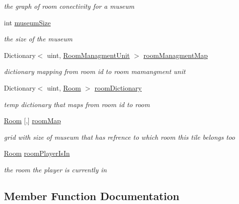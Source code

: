 \begin{DoxyCompactItemize}
\begin{DoxyCompactList}\small\item\em the graph of room conectivity for a museum \end{DoxyCompactList}\item 
int \mbox{\hyperlink{class_museum_controller_afdb90407fa9a9f8712edc815798bf2c0}{museum\+Size}}
\begin{DoxyCompactList}\small\item\em the size of the museum \end{DoxyCompactList}\item 
Dictionary$<$ uint, \mbox{\hyperlink{class_room_managment_unit}{Room\+Managment\+Unit}} $>$ \mbox{\hyperlink{class_museum_controller_a57b266b14d5c65fb079c5a186bdca086}{room\+Managment\+Map}}
\begin{DoxyCompactList}\small\item\em dictionary mapping from room id to room mamangment unit \end{DoxyCompactList}\item 
Dictionary$<$ uint, \mbox{\hyperlink{class_room}{Room}} $>$ \mbox{\hyperlink{class_museum_controller_a7a6b5291769b64502b696b1d12a9622c}{room\+Dictionary}}
\begin{DoxyCompactList}\small\item\em temp dictionary that maps from room id to room \end{DoxyCompactList}\item 
\mbox{\hyperlink{class_room}{Room}} \mbox{[},\mbox{]} \mbox{\hyperlink{class_museum_controller_a8f8aae6242a4e941a011e2f50b51823d}{room\+Map}}
\begin{DoxyCompactList}\small\item\em grid with size of museum that has refrence to which room this tile belongs too \end{DoxyCompactList}\item 
\mbox{\hyperlink{class_room}{Room}} \mbox{\hyperlink{class_museum_controller_ad8a32fa2d9bbd8d2e995331183cd20fb}{room\+Player\+Is\+In}}
\begin{DoxyCompactList}\small\item\em the room the player is currently in \end{DoxyCompactList}\end{DoxyCompactItemize}


\subsection{Member Function Documentation}
\mbox{\label{class_museum_controller_a410c60188546e65ea43c8d7c85cc0713}} 
